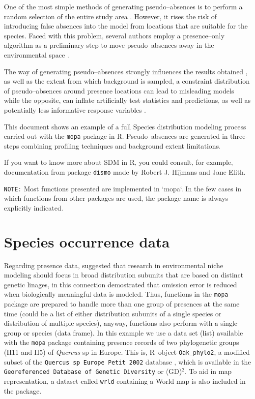 \documentclass[10pt,a4paper]{article}
\begin{document}
One of the most simple methods of generating pseudo--absences is to perform a random selection of the entire study area \citep{jiang_satellite-derived_2014, maria_teresa_multi-temporal_2014, sequeira_predicting_2014}. However, it rises the risk of introducing false absences into the model from locations that are suitable for the species. Faced with this problem, several authors employ a presence--only algorithm as a preliminary step to move pseudo--absences away in the environmental space \citep{zaniewski_predicting_2002, engler_improved_2004, barbet-massin_selecting_2012, liu_species_2013}. 

The way of generating pseudo--absences strongly influences the results obtained \citep{lobo_uncertain_2010, wisz_pseudo-absence_2009, barbet-massin_selecting_2012, hirzel_assessing_2001}, as well as the extent from which background is sampled, a constraint distribution of pseudo--absences around presence locations can lead to misleading models while the opposite, can inflate artificially test statistics and predictions, as well as potentially less informative response variables \citep{jeremy_vanderwal_selecting_2009}.

This document shows an example of a full Species distribution modeling process carried out with the \texttt{mopa} package in R. Pseudo--absences are generated in three-steps combining profiling techniques and background extent limitations. 

If you want to know more about SDM in R, you could consult, for example, documentation from package \texttt{dismo} made by Robert J. Hijmans and Jane Elith.


\texttt{NOTE:} Most functions presented are implemented in `mopa`. In the few cases in which functions from other packages are used, the package name is always explicitly indicated.

\section{Species occurrence data}

Regarding presence data, \citet{hernandez_effect_2006} suggested that research in environmental niche modeling should focus in broad distribution subunits that are based on distinct genetic linages, in this connection \citet{gonzalez_population_2011} demostrated that omission error is reduced when biologically meaningful data is modeled. Thus, functions in the \texttt{mopa} package are prepared to handle more than one group of presences at the same time (could be a list of either distribution subunits of a single species or distribution of multiple species), anyway, functions also perform with a single group or species (data frame). In this example we use a data set (list) available with the \texttt{mopa} package containing presence records of two phylogenetic groups (H11 and H5) of \textit{Quercus} sp in Europe. This is, R--object \texttt{Oak\_phylo2}, a modified subset of the \texttt{Quercus sp Europe Petit 2002} database \citep{petit_chloroplast_2002}, which is available in the \texttt{Georeferenced Database of Genetic Diversity} or (GD)$^{2}$. To aid in map representation, a dataset called \texttt{wrld} containing a World map is also included in the package. 
\end{document}
